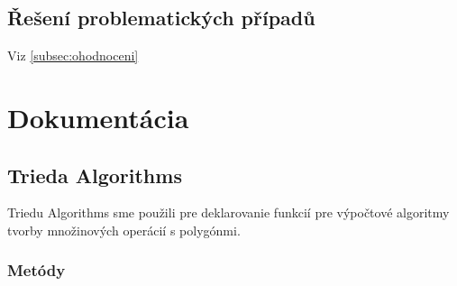 \documentclass[12pt]{article}
\begin{document}
\subsection{Řešení problematických případů}
Viz \ref{subsec:ohodnoceni}


\section{Dokumentácia}
\subsection{Trieda Algorithms}
Triedu Algorithms sme použili pre deklarovanie funkcií pre výpočtové algoritmy tvorby množinových operácií s polygónmi.

\subsubsection{Metódy}
\end{document}
